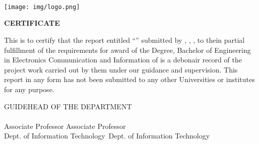 \begin{titlepage}
	\vfill
	\begin{center}
		\textbf{\MakeUppercase{\cUniversity}}\\
		\textbf{\MakeUppercase{\cDepartment} }\\
		\textbf{\MakeUppercase{\cCampus}} \\
		\vspace{1cm}		
		\texttt{[image: img/logo.png]}		

		
		\textbf{
			\Large{
				CERTIFICATE
			}
		}


	\end{center}
	
	\noindent This is to certify that the report entitled “\textbf{\cTitle}” submitted by \textbf{\MakeUppercase{\cSubmittedI}}, \textbf{\MakeUppercase{\cSubmittedII}}, 
	\textbf{\MakeUppercase{\cSubmittedIII}},
	\textbf{\MakeUppercase{\cSubmittedIV}}
	to the\cUniversity in partial fulfillment of the requirements for  award of the Degree, Bachelor of Engineering in Electronics Communication and Information of is a debonair record of the project work carried out by them under our guidance and supervision. This report in any form has not been submitted to any other Universities or institutes for any purpose.
	
	\vspace{2cm}
	
	
	\noindent GUIDE\hfill HEAD OF THE DEPARTMENT\\
	\cGuide \hfill \cHod \\
	Associate Professor \hfill Associate Professor\\
	Dept. of Information Technology\ \hfill Dept. of Information Technology\\
	
\end{titlepage}


